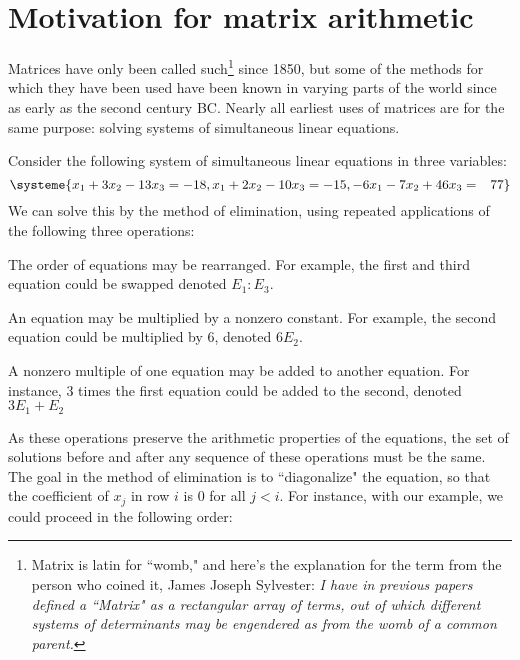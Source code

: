 \documentclass[m3380-lec-main.tex]{subfiles}
\begin{document}
\section{Motivation for matrix arithmetic}
Matrices have only been called such\footnote{Matrix is latin for ``womb," and here's the explanation for the term from the person who coined it, James Joseph Sylvester: \emph{I have in previous papers defined a ``Matrix" as a rectangular array of terms, out of which different systems of determinants may be engendered as from the womb of a common parent.}} since 1850, but some of the methods for which they have been used have been known in varying parts of the world since as early as the second century BC. Nearly all earliest uses of matrices are for the same purpose: solving systems of simultaneous linear equations.
\begin{exmp}
Consider the following system of simultaneous linear equations in three variables:
\begin{equation}\label{eq:sys}
\systeme{x_1 + 3x_2 - 13x_3 = -18, x_1 + 2x_2 - 10x_3 = -15, -6x_1 - 7x_2 + 46x_3 = \phantom{-}77}\end{equation}
We can solve this by the method of elimination, using repeated applications of the following three operations:
\begin{enum}
\item The order of equations may be rearranged. For example, the first and third equation could be swapped denoted $E_1:E_3$.
\item An equation may be multiplied by a nonzero constant. For example, the second equation could be multiplied by $6$, denoted $6E_2$.
\item A nonzero multiple of one equation may be added to another equation. For instance, 3 times the first equation could be added to the second, denoted $3E_1+E_2$
\end{enum}
As these operations preserve the arithmetic properties of the equations, the set of solutions before and after any sequence of these operations must be the same. The goal in the method of elimination is to ``diagonalize" the equation, so that the coefficient of $x_j$ in row $i$ is $0$ for all $j<i$. For instance, with our example, we could proceed in the following order:
%

\end{exmp}
\end{document}

